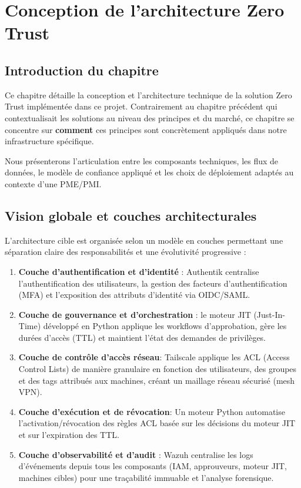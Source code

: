 \chapter{Conception de l'architecture Zero Trust}

\section{Introduction du chapitre}

Ce chapitre détaille la conception et l'architecture technique de la solution Zero Trust implémentée dans ce projet. Contrairement au chapitre précédent qui contextualisait les solutions au niveau des principes et du marché, ce chapitre se concentre sur \textbf{comment} ces principes sont concrètement appliqués dans notre infrastructure spécifique.

Nous présenterons l'articulation entre les composants techniques, les flux de données, le modèle de confiance appliqué et les choix de déploiement adaptés au contexte d'une PME/PMI.

\section{Vision globale et couches architecturales}

L'architecture cible est organisée selon un modèle en couches permettant une séparation claire des responsabilités et une évolutivité progressive :

\begin{enumerate}
	\item \textbf{Couche d'authentification et d'identité} : Authentik centralise l'authentification des utilisateurs, la gestion des facteurs d'authentification (MFA) et l'exposition des attributs d'identité via OIDC/SAML.
	
	\item \textbf{Couche de gouvernance et d'orchestration} : le moteur JIT (Just-In-Time) développé en Python applique les workflows d'approbation, gère les durées d'accès (TTL) et maintient l'état des demandes de privilèges.
	
	\item \textbf{Couche de contrôle d'accès réseau}: Tailscale applique les ACL (Access Control Lists) de manière granulaire en fonction des utilisateurs, des groupes et des tags attribués aux machines, créant un maillage réseau sécurisé (mesh VPN).
	
	\item \textbf{Couche d'exécution et de révocation}: Un moteur Python automatise l'activation/révocation des règles ACL basée sur les décisions du moteur JIT et sur l'expiration des TTL.
	
	\item \textbf{Couche d'observabilité et d'audit} : Wazuh centralise les logs d'événements depuis tous les composants (IAM, approuveurs, moteur JIT, machines cibles) pour une traçabilité immuable et l'analyse forensique.
\end{enumerate}

